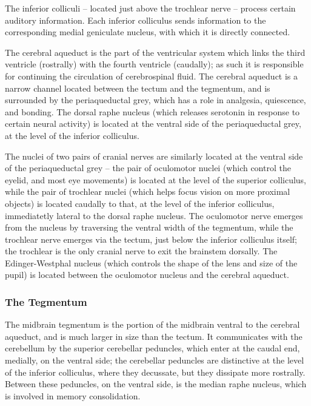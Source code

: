 The inferior colliculi -- located just above the trochlear nerve -- process certain auditory information. Each inferior colliculus sends information to the corresponding medial geniculate nucleus, with which it is directly connected.

The cerebral aqueduct is the part of the ventricular system which links the third ventricle (rostrally) with the fourth ventricle (caudally); as such it is responsible for continuing the circulation of cerebrospinal fluid. The cerebral aqueduct is a narrow channel located between the tectum and the tegmentum, and is surrounded by the periaqueductal grey, which has a role in analgesia, quiescence, and bonding. The dorsal raphe nucleus (which releases serotonin in response to certain neural activity) is located at the ventral side of the periaqueductal grey, at the level of the inferior colliculus.

The nuclei of two pairs of cranial nerves are similarly located at the ventral side of the periaqueductal grey -- the pair of oculomotor nuclei (which control the eyelid, and most eye movements) is located at the level of the superior colliculus, while the pair of trochlear nuclei (which helps focus vision on more proximal objects) is located caudally to that, at the level of the inferior colliculus, immediatetly lateral to the dorsal raphe nucleus. The oculomotor nerve emerges from the nucleus by traversing the ventral width of the tegmentum, while the trochlear nerve emerges via the tectum, just below the inferior colliculus itself; the trochlear is the only cranial nerve to exit the brainstem dorsally. The Edinger-Westphal nucleus (which controls the shape of the lens and size of the pupil) is located between the oculomotor nucleus and the cerebral aqueduct.

\hypertarget{the-tegmentum}{%
\subsubsection{The Tegmentum}\label{the-tegmentum}}

The midbrain tegmentum is the portion of the midbrain ventral to the cerebral aqueduct, and is much larger in size than the tectum. It communicates with the cerebellum by the superior cerebellar peduncles, which enter at the caudal end, medially, on the ventral side; the cerebellar peduncles are distinctive at the level of the inferior colliculus, where they decussate, but they dissipate more rostrally. Between these peduncles, on the ventral side, is the median raphe nucleus, which is involved in memory consolidation.

